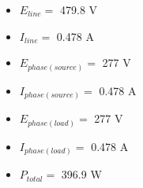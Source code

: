 \vskip 10pt

\begin{itemize}
\item{} $E_{line} =$ 479.8 V
\item{} $I_{line} =$ 0.478 A
\item{} $E_{phase(source)} =$ 277 V
\item{} $I_{phase(source)} =$ 0.478 A
\item{} $E_{phase(load)} =$ 277 V
\item{} $I_{phase(load)} =$ 0.478 A
\item{} $P_{total} =$ 396.9 W
\end{itemize}





